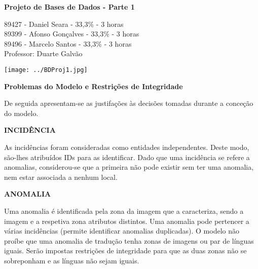 \documentclass[10pt]{report}
\begin{document}
    \begin{titlepage}
        \begin{center}

            \vspace*{\fill}
            \Huge
            \textbf{Projeto de Bases de Dados - Parte 1}
            
            \vspace*{\fill}

            \Large
            89427 - Daniel Seara - 33,3\% - 3 horas \\
            89399 - Afonso Gonçalves - 33,3\% - 3 horas \\
            89496 - Marcelo Santos - 33,3\% - 3 horas \\

            \bigskip
            Professor: Duarte Galvão
        
        \end{center}
\end{titlepage}

\begin{center}
    \vspace*{-2cm}
    \texttt{[image: ../BDProj1.jpg]}
\end{center}
\newpage

    \LARGE
    \begin{center}
        \textbf{Problemas do Modelo e Restrições de Integridade}
    \end{center}

    \bigskip
    \bigskip

    \normalsize

    \noindent De seguida apresentam-se as justifações às decisões tomadas durante a conceção do modelo. 

    \vspace*{10mm}
    \noindent\textbf{INCIDÊNCIA}

        As incidências foram consideradas como entidades independentes. Deste modo, são-lhes atribuídos IDs para as identificar.
        Dado que uma incidência se refere a anomalias, considerou-se que a primeira não pode existir sem ter uma anomalia, nem estar associada a nenhum local.
    
    \vspace*{10mm}
    \noindent\textbf{ANOMALIA}

        
        Uma anomalia é identificada pela zona da imagem que a caracteriza, sendo a imagem e a respetiva zona atributos distintos.
        Uma anomalia pode pertencer a várias incidências (permite identificar anomalias duplicadas).
        O modelo não proíbe que uma anomalia de tradução tenha zonas de imagens ou par de línguas iguais. Serão impostas restrições de integridade para que as duas zonas não se sobreponham e as línguas não sejam iguais.
    
\end{document}
